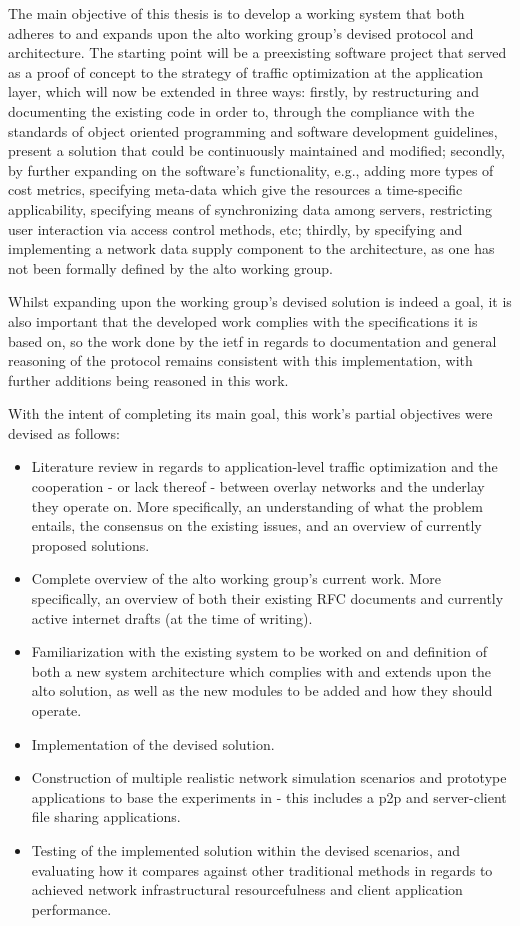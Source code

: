     The main objective of this thesis is to develop a working system that both adheres to and expands upon the \gls{alto} working group's devised protocol and architecture.
    The starting point will be a preexisting software project that served as a proof of concept to the strategy of traffic optimization at the application layer, which will now be extended in three ways: firstly, by restructuring and documenting the existing code in order to, through the compliance with the standards of object oriented programming and software development guidelines, present a solution that could be continuously maintained and modified; secondly, by further expanding on the software's functionality, e.g., adding more types of cost metrics, specifying meta-data which give the resources a time-specific applicability, specifying means of synchronizing data among servers, restricting user interaction via access control methods, etc; thirdly, by specifying and implementing a network data supply component to the architecture, as one has not been formally defined by the \gls{alto} working group.

    Whilst expanding upon the working group's devised solution is indeed a goal, it is also important that the developed work complies with the specifications it is based on, so the work done by the \gls{ietf} in regards to documentation and general reasoning of the protocol remains consistent with this implementation, with further additions being reasoned in this work.

    With the intent of completing its main goal, this work's partial objectives were devised as follows:

\begin{itemize}
    \item Literature review in regards to application-level traffic optimization and the cooperation - or lack thereof - between overlay networks and the underlay they operate on.
        More specifically, an understanding of what the problem entails, the consensus on the existing issues, and an overview of currently proposed solutions.
    \item Complete overview of the \gls{alto} working group's current work.
        More specifically, an overview of both their existing RFC documents and currently active internet drafts (at the time of writing).
    \item Familiarization with the existing system to be worked on and definition of both a new system architecture which complies with and extends upon the \gls{alto} solution, as well as the new modules to be added and how they should operate.
    \item Implementation of the devised solution.
    \item Construction of multiple realistic network simulation scenarios and prototype applications to base the experiments in - this includes a \gls{p2p} and server-client file sharing applications.
    \item Testing of the implemented solution within the devised scenarios, and evaluating how it compares against other traditional methods in regards to achieved network infrastructural resourcefulness and client application performance.
\end{itemize}

